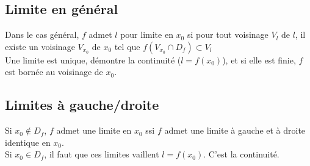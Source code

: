 \subsection{Limite en général}\label{subsec:limite-en-general}

Dans le cas général, $f$ admet $l$ pour limite en $x_0$ si pour tout voisinage $V_l$ de $l$, il existe un voisinage $V_x_0$ de $x_0$ tel que $f(V_x_0 \cap D_f) \subset V_l$\\
Une limite est unique, démontre la continuité ($l = f(x_0)$), et si elle est finie, $f$ est bornée au voisinage de $x_0$.\\

\subsection{Limites à gauche/droite}\label{subsec:limites-a-gauche/droite}

Si $x_0 \notin D_f$, $f$ admet une limite en $x_0$ ssi $f$ admet une limite à gauche et à droite identique en $x_0$.\\
Si $x_0 \in D_f$, il faut que ces limites vaillent $l = f(x_0)$. C'est la continuité.\\





